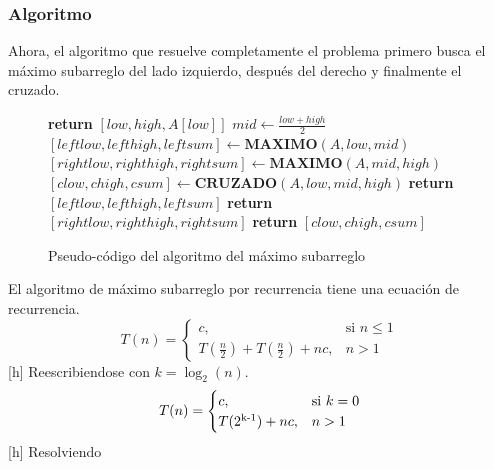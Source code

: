 \documentclass[12pt,twoside]{article}
\begin{document}
\subsubsection{Algoritmo}
Ahora, el algoritmo que resuelve completamente el problema primero busca el m\'aximo subarreglo del lado izquierdo, despu\'es del derecho y finalmente el cruzado.
\begin{figure}[h]
    \centering
    \begin{algorithmic}[1]
                \State \textbf{return} $[low, high, A[low]]$
            \Else
                \State $mid \longleftarrow \frac{low+high}{2}$
                \State $[leftlow, lefthigh, leftsum] \longleftarrow \textbf{MAXIMO}(A, low, mid)$
                \State $[rightlow, righthigh, rightsum] \longleftarrow \textbf{MAXIMO}(A, mid, high)$
                \State $[clow, chigh, csum] \longleftarrow \textbf{CRUZADO}(A, low, mid, high)$
                    \State \textbf{return} $[leftlow, lefthigh, leftsum]$
                    \State \textbf{return} $[rightlow, righthigh, rightsum]$    
                \Else
                    \State \textbf{return} $[clow, chigh, csum]$
                \EndIf
            \EndIf
        \EndProcedure
    \end{algorithmic}
    \caption{Pseudo-c\'odigo del algoritmo del m\'aximo subarreglo}
    \label{fig:maxm}
\end{figure}
El algoritmo de m\'aximo subarreglo por recurrencia tiene una ecuaci\'on de recurrencia.
\[
    T(n) = 
\begin{cases}
    c, & \text{si } n \leq 1 \\
    T(\frac{n}{2}) + T(\frac{n}{2}) + nc, & n > 1
\end{cases}
\][h]
Reescribiendose con $k = \log_2(n)$.
\[
    T(n) = 
\begin{cases}
    c, & \text{si } k = 0 \\
    T(2\textsuperscript{k-1}) + nc, & n > 1
\end{cases}
\][h]
Resolviendo
\end{document}
